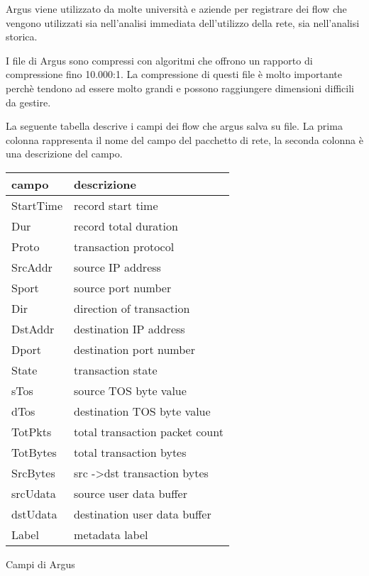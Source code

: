 \documentclass[../main.tex]{subfiles}
\begin{document}
Argus viene utilizzato da molte università e aziende per registrare dei flow che vengono utilizzati sia nell'analisi immediata dell'utilizzo della rete, sia nell'analisi storica.

I file di Argus sono compressi con algoritmi che offrono un rapporto di compressione fino 10.000:1. La compressione di questi file è molto importante perchè tendono ad essere molto grandi e possono raggiungere dimensioni difficili da gestire.


La seguente tabella descrive i campi dei flow che argus salva su file. La prima colonna rappresenta il nome del campo del pacchetto di rete, la seconda colonna è una descrizione del campo.

\begin{table}[h]
				\centering
\begin{tabular}{|l|l|}
\hline
\textbf{campo} & \textbf{descrizione}                    \\ \hline
StartTime      & record start time                       \\ \hline
Dur            & record total duration                   \\ \hline
Proto          & transaction protocol                    \\ \hline
SrcAddr        & source IP address                       \\ \hline
Sport          & source port number                      \\ \hline
Dir            & direction of transaction                \\ \hline
DstAddr        & destination IP address                  \\ \hline
Dport          & destination port number                 \\ \hline
State          & transaction state                       \\ \hline
sTos           & source TOS byte value                   \\ \hline
dTos           & destination TOS byte value              \\ \hline
TotPkts        & total transaction packet count          \\ \hline
TotBytes       & total transaction bytes                 \\ \hline
SrcBytes       & src -\textgreater dst transaction bytes \\ \hline
srcUdata       & source user data buffer                 \\ \hline
dstUdata       & destination user data buffer            \\ \hline
Label          & metadata label                          \\ \hline
\end{tabular}\par
\bigskip
Campi di Argus
\end{table}
\end{document}
